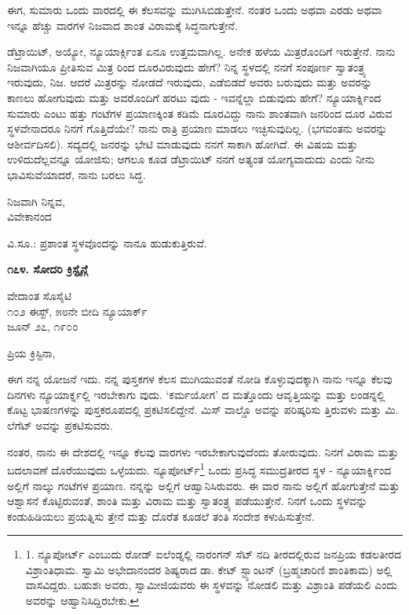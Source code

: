 ಈಗ, ಸುಮಾರು ಒಂದು ವಾರದಲ್ಲಿ ಈ ಕೆಲಸವನ್ನು ಮುಗಿಸಿಬಿಡುತ್ತೇನೆ. ನಂತರ ಒಂದು ಅಥವಾ ಎರಡು ಅಥವಾ ಇನ್ನೂ ಹೆಚ್ಚು ವಾರಗಳ ನಿಜವಾದ ಶಾಂತ ವಿರಾಮಕ್ಕೆ ಸಿದ್ಧನಾಗುತ್ತೇನೆ.

ಡೆಟ್ರಾಯಿಟ್, ಅಯ್ಯೋ, ನ್ಯೂಯಾರ್ಕ್ಗಿಂತ ಏನೂ ಉತ್ತಮವಾಗಿಲ್ಲ. ಅನೇಕ ಹಳೆಯ ಮಿತ್ರರೊಂದಿಗೆ ಇರುತ್ತೇನೆ. ನಾನು ನಿಜವಾಗಿಯೂ ಪ್ರೀತಿಸುವ ಮಿತ್ರ ರಿಂದ ದೂರವಿರುವುದು ಹೇಗೆ? ನಿನ್ನ ಸ್ಥಳದಲ್ಲಿ ನನಗೆ ಸಂಪೂರ್ಣ ಸ್ವಾತಂತ್ರ್ಯ ಇರುವುದು, ನಿಜ. ಆದರೆ ಮಿತ್ರರನ್ನು ನೋಡದೆ ಇರುವುದು, ಎಡೆಬಿಡದೆ ಅವರು ಬರುವುದು ಮತ್ತು ಅವರನ್ನು ಕಾಣಲು ಹೋಗುವುದು ಮತ್ತು ಅವರೊಂದಿಗೆ ಹರಟು ವುದು - ಇವನ್ನೆಲ್ಲಾ ಬಿಡುವುದು ಹೇಗೆ? ನ್ಯೂಯಾರ್ಕ್ನಿಂದ ಸುಮಾರು ಎಂಟು ಹತ್ತು ಗಂಟೆಗಳ ಪ್ರಯಾಣಕ್ಕಿಂತ ಕಡಿಮೆ ದೂರವಿದ್ದು ನಾನು ಶಾಂತವಾಗಿ ಜನರಿಂದ ದೂರ ವಿರುವ ಸ್ಥಳವೇನಾದರೂ ನಿನಗೆ ಗೊತ್ತಿದೆಯೇ? ನಾನು ರಾತ್ರಿ ಪ್ರಯಾಣ ಮಾಡಲು ಇಚ್ಛಿಸುವುದಿಲ್ಲ. (ಭಗವಂತನು ಅವರನ್ನು ಆಶೀರ್ವದಿಸಲಿ). ಸದ್ಯದಲ್ಲಿ ಜನರನ್ನು ಭೇಟಿ ಮಾಡುವುದು ನನಗೆ ಸಾಕಾಗಿ ಹೋಗಿದೆ. ಈ ವಿಷಯ ಮತ್ತು ಉಳಿದುದೆಲ್ಲವನ್ನೂ ಯೋಜಿಸು; ಆಗಲೂ ಕೂಡ ಡೆಟ್ರಾಯಿಟ್ ನನಗೆ ಅತ್ಯಂತ ಯೋಗ್ಯವಾದುದು ಎಂದು ನೀನು ಭಾವಿಸುವೆಯಾದರೆ, ನಾನು ಬರಲು ಸಿದ್ಧ.

\begin{flushright}
ನಿಜವಾಗಿ ನಿನ್ನವ,\\ವಿವೇಕಾನಂದ
\end{flushright}

ವಿ.ಸೂ.: ಪ್ರಶಾಂತ ಸ್ಥಳವೊಂದನ್ನು ನಾನೂ ಹುಡುಕುತ್ತಿರುವೆ.

\begin{center}
\textbf{೧೭೪. ಸೋದರಿ ಕ್ರಿಸ್ಟೈನ್ಗೆ}
\end{center}

\begin{flushright}
ವೇದಾಂತ ಸೊಸೈಟಿ\\೧೦೨ ಈಸ್ಟ್, ೫೮ನೇ ಬೀದಿ ನ್ಯೂಯಾರ್ಕ್\\ಜೂನ್ ೨೭, ೧೯೦೦
\end{flushright}

ಪ್ರಿಯ ಕ್ರಿಸ್ಟಿನಾ,

ಈಗ ನನ್ನ ಯೋಜನೆ ಇದು. ನನ್ನ ಪುಸ್ತಕಗಳ ಕೆಲಸ ಮುಗಿಯುವಂತೆ ನೋಡಿ ಕೊಳ್ಳುವುದಕ್ಕಾಗಿ ನಾನು ಇನ್ನೂ ಕೆಲವು ದಿನಗಳು ನ್ಯೂಯಾರ್ಕ್ನಲ್ಲಿ ಇರಬೇಕಾಗು ವುದು. ‘ಕರ್ಮಯೋಗ’ ದ ಮತ್ತೊಂದು ಆವೃತ್ತಿಯನ್ನು ಮತ್ತು ಲಂಡನ್ನಲ್ಲಿ ಕೊಟ್ಟ ಭಾಷಣಗಳನ್ನು ಪುಸ್ತಕರೂಪದಲ್ಲಿ ಪ್ರಕಟಿಸಲಿದ್ದೇನೆ. ಮಿಸ್ ವಾಲ್ಡೊ ಅವನ್ನು ಪರಿಷ್ಕರಿಸು ತ್ತಿರುವಳು ಮತ್ತು ಮಿ. ಲೆಗೆಟ್ ಅವನ್ನು ಪ್ರಕಟಿಸುವರು.

ನಂತರ, ನಾನು ಈ ದೇಶದಲ್ಲಿ ಇನ್ನೂ ಕೆಲವು ವಾರಗಳು ಇರಬೇಕಾಗುವುದೆಂದು ತೋರುವುದು. ನಿನಗೆ ವಿರಾಮ ಮತ್ತು ಬದಲಾವಣೆ ದೊರೆಯುವುದು ಒಳ್ಳೆಯದು. ನ್ಯೂಪೋರ್ಟ್\footnote{1. ನ್ಯೂಪೋರ್ಟ್ ಎಂಬುದು ರೋಡ್ ಐಲೆಂಡ್ನಲ್ಲಿ ನಾರಂಗನ್ ಸೆಟ್ ನದಿ ತೀರದಲ್ಲಿರುವ ಜನಪ್ರಿಯ ಕಡಲತೀರದ ವಿಶ್ರಾಂತಿಧಾಮ. ಸ್ವಾಮಿ ಅಭೇದಾನಂದರ ಶಿಷ್ಯರಾದ ಡಾ. ಕೇಟ್ ಸ್ಟ್ಯಾಂಟನ್ (ಬ್ರಹ್ಮಚಾರಿಣಿ ಶಾಂತಿಕಾಮ) ಅಲ್ಲಿ ವಾಸವಿದ್ದರು. ಬಹುಶಃ ಅವರು, ಸ್ವಾಮೀಜಿಯವರು ಈ ಸ್ಥಳವನ್ನು ನೋಡಲಿ ಮತ್ತು ವಿಶ್ರಾಂತಿ ಪಡೆಯಲಿ ಎಂದು ಅವರನ್ನು ಆಹ್ವಾನಿಸಿದ್ದಿರಬೇಕು.} ಒಂದು ಪ್ರಸಿದ್ಧ ಸಮುದ್ರತೀರದ ಸ್ಥಳ - ನ್ಯೂಯಾರ್ಕ್ನಿಂದ ಅಲ್ಲಿಗೆ ನಾಲ್ಕು ಗಂಟೆಗಳ ಪ್ರಯಾಣ. ನನ್ನನ್ನು ಅಲ್ಲಿಗೆ ಆಹ್ವಾನಿಸಿರುವರು. ಈ ವಾರ ನಾನು ಅಲ್ಲಿಗೆ ಹೋಗುತ್ತೇನೆ ಮತ್ತು ಆಶ್ವಾಸನೆ ಕೊಟ್ಟಿರುವಂತೆ, ಶಾಂತಿ ಮತ್ತು ವಿರಾಮ ಮತ್ತು ಸ್ವಾತಂತ್ರ್ಯ ಪಡೆಯುತ್ತೇನೆ. ನಿನಗೆ ಒಂದು ಸ್ಥಳವನ್ನು ಕಂಡುಹಿಡಿಯಲು ಪ್ರಯತ್ನಿಸು ತ್ತೇನೆ ಮತ್ತು ದೊರೆತ ಕೂಡಲೆ ತಂತಿ ಸಂದೇಶ ಕಳುಹಿಸುತ್ತೇನೆ.

